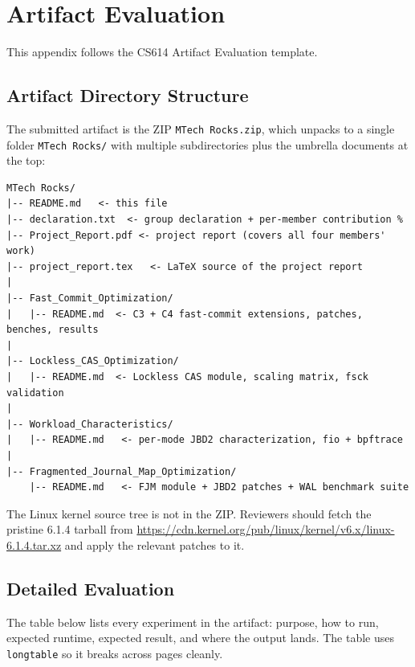 \documentclass[12pt,a4paper]{article}
\begin{document}

\appendix
\clearpage
\section{Artifact Evaluation}

This appendix follows the CS614 Artifact Evaluation template.

\subsection{Artifact Directory Structure}

The submitted artifact is the ZIP \texttt{MTech Rocks.zip}, which
unpacks to a single folder \texttt{MTech Rocks/} with multiple subdirectories plus the umbrella documents at the
top:

\begin{lstlisting}[basicstyle=\ttfamily\scriptsize]
MTech Rocks/
|-- README.md   <- this file
|-- declaration.txt  <- group declaration + per-member contribution %
|-- Project_Report.pdf <- project report (covers all four members' work)
|-- project_report.tex   <- LaTeX source of the project report
|
|-- Fast_Commit_Optimization/
|   |-- README.md  <- C3 + C4 fast-commit extensions, patches, benches, results
|
|-- Lockless_CAS_Optimization/
|   |-- README.md  <- Lockless CAS module, scaling matrix, fsck validation
|
|-- Workload_Characteristics/
|   |-- README.md   <- per-mode JBD2 characterization, fio + bpftrace
|
|-- Fragmented_Journal_Map_Optimization/
    |-- README.md   <- FJM module + JBD2 patches + WAL benchmark suite
\end{lstlisting}

The Linux kernel source tree is not in the ZIP. Reviewers should
fetch the pristine 6.1.4 tarball from
\url{https://cdn.kernel.org/pub/linux/kernel/v6.x/linux-6.1.4.tar.xz}
and apply the relevant patches to it.


\subsection{Detailed Evaluation}

The table below lists every experiment in the artifact: purpose,
how to run, expected runtime, expected result, and where the output
lands. The table uses \texttt{longtable} so it breaks across pages
cleanly.
\end{document}

